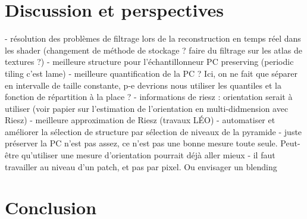 \Conclusion \label{chap:conclusion}



\section{Discussion et perspectives}

- résolution des problèmes de filtrage lors de la reconstruction en temps réel dans les shader (changement de méthode de stockage ? faire du filtrage sur les atlas de textures ?)
- meilleure structure pour l'échantillonneur PC preserving (periodic tiling c'est lame)
- meilleure quantification de la PC ? Ici, on ne fait que séparer en intervalle de taille constante, p-e devrions nous utiliser les quantiles et la fonction de répartition à la place ?
- informations de riesz : orientation serait à utiliser (voir papier sur l'estimation de l'orientation en multi-didmension avec Riesz)
- meilleure approximation de Riesz (travaux LÉO)
- automatiser et améliorer la sélection de structure par sélection de niveaux de la pyramide
- juste préserver la PC n'est pas assez, ce n'est pas une bonne mesure toute seule. Peut-être qu'utiliser une mesure d'orientation pourrait déjà aller mieux
- il faut travailler au niveau d'un patch, et pas par pixel. Ou envisager un blending




\section{Conclusion}
